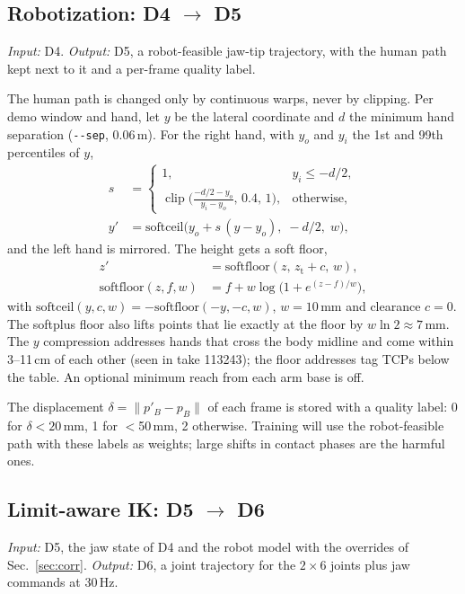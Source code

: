 \documentclass[conference,10pt]{IEEEtran}
\newcommand{\mm}{\,mm\xspace}
\DeclareMathOperator{\clip}{clip}
\begin{document}
\subsection{Robotization: D4 $\to$ D5}\label{sec:robotize}
\emph{Input:} D4. \emph{Output:} D5, a robot-feasible jaw-tip trajectory, with the human path kept next to it and a
per-frame quality label.

The human path is changed only by continuous warps, never by clipping. Per demo window and hand, let $y$ be the lateral
coordinate and $d$ the minimum hand separation (\texttt{-{}-sep}, 0.06\,m). For the right hand, with $y_o$ and $y_i$ the
1st and 99th percentiles of $y$,
\begin{align}
s&=\begin{cases}1, & y_i\le -d/2,\\ \clip\!\big(\tfrac{-d/2-y_o}{y_i-y_o},\,0.4,\,1\big), & \text{otherwise,}\end{cases}\\
y'&=\mathrm{softceil}\big(y_o+s\,(y-y_o),\;-d/2,\;w\big),
\end{align}
and the left hand is mirrored. The height gets a soft floor,
\begin{align}
z'&=\mathrm{softfloor}(z,\,z_\mathrm{t}+c,\,w),\\
\mathrm{softfloor}(z,f,w)&=f+w\log\!\big(1+e^{(z-f)/w}\big),
\end{align}
with $\mathrm{softceil}(y,c,w)=-\mathrm{softfloor}(-y,-c,w)$, $w=10$\mm and clearance $c=0$. The softplus floor also lifts
points that lie exactly at the floor by $w\ln2\approx7$\mm. The $y$ compression addresses hands that cross the body
midline and come within 3--11\,cm of each other (seen in take 113243); the floor addresses tag TCPs below the table. An
optional minimum reach from each arm base is off.

The displacement $\delta=\lVert p'_B-p_B\rVert$ of each frame is stored with a quality label: 0 for $\delta<20$\mm, 1 for
$<$50\mm, 2 otherwise. Training will use the robot-feasible path with these labels as weights; large shifts in contact
phases are the harmful ones.

\subsection{Limit-aware IK: D5 $\to$ D6}\label{sec:plan}
\emph{Input:} D5, the jaw state of D4 and the robot model with the overrides of Sec.~\ref{sec:corr}. \emph{Output:} D6, a
joint trajectory for the $2\times6$ joints plus jaw commands at 30\,Hz.
\end{document}
